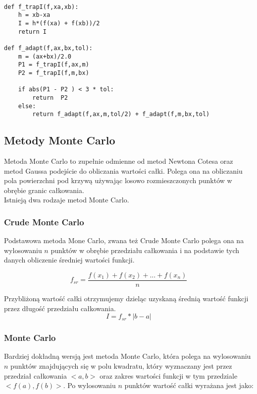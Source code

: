 \documentclass[12pt,twoside]{article}
\begin{document}
\begin{lstlisting}[caption={Kod w języku python implementujący metodę simpsona}]

def f_trapI(f,xa,xb):
    h = xb-xa
    I = h*(f(xa) + f(xb))/2
    return I

def f_adapt(f,ax,bx,tol):
    m = (ax+bx)/2.0
    P1 = f_trapI(f,ax,m)
    P2 = f_trapI(f,m,bx)

    if abs(P1 - P2 ) < 3 * tol:
        return  P2
    else:
        return f_adapt(f,ax,m,tol/2) + f_adapt(f,m,bx,tol)

\end{lstlisting}
\label{Listing 5}

\subsection{Metody Monte Carlo}

Metoda Monte Carlo to zupełnie odmienne od metod Newtona Cotesa oraz metod Gaussa podejście do obliczania wartości całki. Polega ona na obliczaniu pola powierzchni pod krzywą używając losowo rozmieszczonych punktów w obrębie granic całkowania.\\
Istnieją dwa rodzaje metod Monte Carlo.

\subsubsection{Crude Monte Carlo}
Podstawowa metoda Mone Carlo, zwana też Crude Monte Carlo polega ona na wylosowaniu $n$ punktów w obrębie przedziału całkowania i na podstawie tych danych obliczenie średniej wartości funkcji. \cite{MonteCarlo_1}

\begin{equation}
f_{sr} = \frac{f(x_1)+f(x_2) + ... + f(x_n)}{n}
\label{Eq:MonteCarlo1}
\end{equation}

Przybliżoną wartość całki otrzymujemy dzieląc uzyskaną średnią wartość funkcji przez długość przedziału całkowania.
\begin{equation}
 I = f_{sr} * |b-a| 
\label{Eq:MonteCarlo2}
\end{equation}


\subsubsection{Monte Carlo}
Bardziej dokładną wersją jest metoda Monte Carlo, która polega na wylosowaniu $n$ punktów znajdujących się w polu kwadratu, który wyznaczany jest przez przedział całkowania $<a,b>$ oraz zakres wartości funkcji w tym przedziale $<f(a),f(b)>$. Po wylosowaniu $n$ punktów wartość całki wyrażana jest jako:
\end{document}
